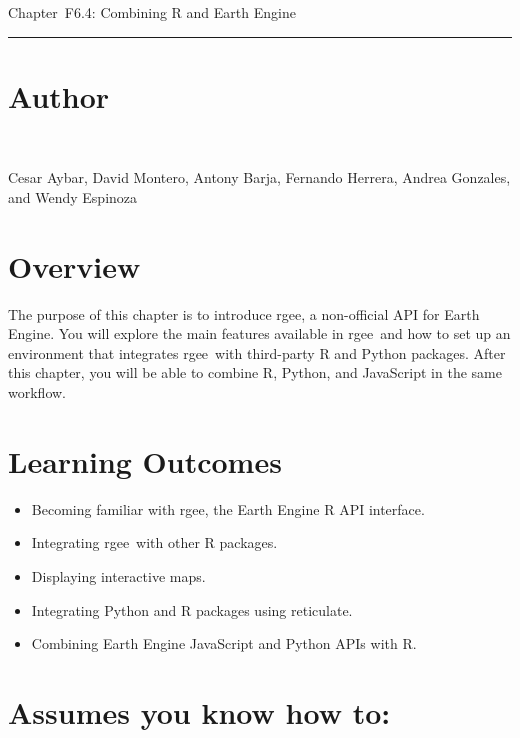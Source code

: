 \documentclass[
  letterpaper,
  DIV=11,
  numbers=noendperiod]{scrreprt}
\providecommand{\tightlist}{%
  \setlength{\itemsep}{0pt}\setlength{\parskip}{0pt}}\usepackage{longtable,booktabs,array}
\begin{document}
Chapter~F6.4: Combining R and Earth Engine

\begin{center}\rule{0.5\linewidth}{0.5pt}\end{center}

\hypertarget{author-23}{%
\section*{Author}\label{author-23}}


~

Cesar Aybar, David Montero, Antony Barja, Fernando Herrera, Andrea
Gonzales, and Wendy Espinoza

\hypertarget{overview-24}{%
\section*{Overview}\label{overview-24}}


The purpose of this chapter is to introduce rgee, a non-official API for
Earth Engine. You will explore the main features available in rgee~and
how to set up an environment that integrates rgee~with third-party R and
Python packages. After this chapter, you will be able to combine R,
Python, and JavaScript in the same workflow.

\hypertarget{learning-outcomes-24}{%
\section*{Learning Outcomes}\label{learning-outcomes-24}}


\begin{itemize}
\tightlist
\item
  Becoming familiar with rgee, the Earth Engine R API interface.
\item
  Integrating rgee~with other R packages.
\item
  Displaying interactive maps.
\item
  Integrating Python and R packages using reticulate.
\item
  Combining Earth Engine JavaScript and Python APIs with R.
\end{itemize}

\hypertarget{assumes-you-know-how-to-24}{%
\section*{Assumes you know how to:}\label{assumes-you-know-how-to-24}}
\end{document}
